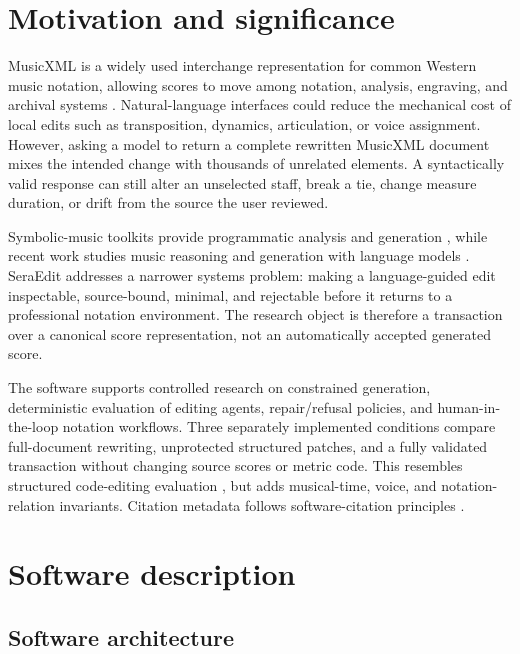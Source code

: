 \documentclass[preprint,12pt,a4paper]{elsarticle}
\begin{document}
\linenumbers

\section{Motivation and significance}

MusicXML is a widely used interchange representation for common Western music
notation, allowing scores to move among notation, analysis, engraving, and archival
systems \cite{good2021musicxml}. Natural-language interfaces could reduce the
mechanical cost of local edits such as transposition, dynamics, articulation, or voice
assignment. However, asking a model to return a complete rewritten MusicXML document
mixes the intended change with thousands of unrelated elements. A syntactically valid
response can still alter an unselected staff, break a tie, change measure duration, or
drift from the source the user reviewed.

Symbolic-music toolkits provide programmatic analysis and generation
\cite{cuthbert2010music21,raffel2014prettymidi}, while recent work studies music
reasoning and generation with language models \cite{yuan2024chatmusician,zhou2024reason}.
SeraEdit addresses a narrower systems problem: making a language-guided edit
inspectable, source-bound, minimal, and rejectable before it returns to a professional
notation environment. The research object is therefore a transaction over a canonical
score representation, not an automatically accepted generated score.

The software supports controlled research on constrained generation, deterministic
evaluation of editing agents, repair/refusal policies, and human-in-the-loop notation
workflows. Three separately implemented conditions compare full-document rewriting,
unprotected structured patches, and a fully validated transaction without changing
source scores or metric code. This resembles structured code-editing evaluation
\cite{guo2024codeeditorbench}, but adds musical-time, voice, and notation-relation
invariants. Citation metadata follows software-citation principles
\cite{smith2016softwarecitation}.

\section{Software description}

\subsection{Software architecture}
\end{document}
